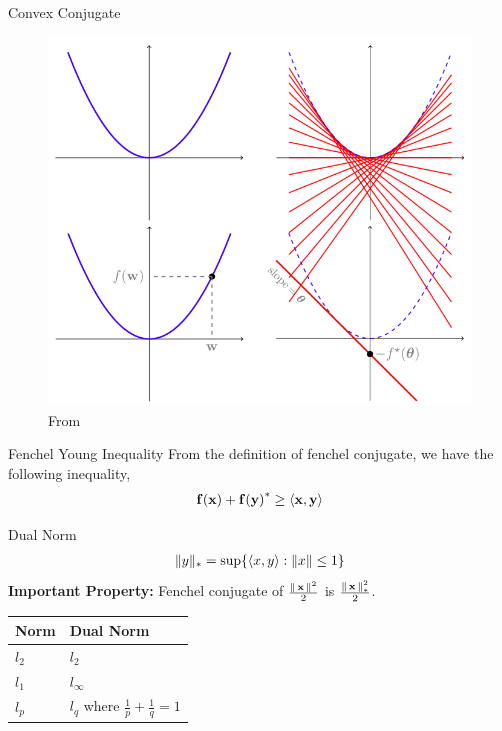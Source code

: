 \begin{frame}{Convex Conjugate}
  \begin{figure}
    \includegraphics[scale=0.27]{images/fenchel.png}
    \caption{From \cite{ShSh2012}}
  \end{figure}
\end{frame}

\begin{frame}{Fenchel Young Inequality}
  From the definition of fenchel conjugate, we have the following inequality,
  \begin{align*}
    \operatorname{\mathbf{f}}(\operatorname{\mathbf{x}}) + {\operatorname{\mathbf{f}}(\operatorname{\mathbf{y}})}^{*} \ge \langle {\operatorname{\mathbf{x}}} , {\operatorname{\mathbf{y}}} \rangle
  \end{align*}
\end{frame}

\begin{frame}{Dual Norm}
  \begin{align*}
    \|y\|_{*} = \sup\{\langle {x} , {y} \rangle : \|x\| \le 1\}
  \end{align*}
      {\bf Important Property:} Fenchel conjugate of $\frac{\|\operatorname{\mathbf{x}}\|^2}{2}$ is $\frac{\|\operatorname{\mathbf{x}}\|_{*}^2}{2}$.
      \begin{center}
        \begin{tabular}{ll}
          Norm & Dual Norm\\
          \hline
          $l_2$ & $l_2$\\
          $l_1$ & $l_{\infty}$\\
          $l_p$ & $l_q$ where $\frac{1}{p}+\frac{1}{q}=1$\\
        \end{tabular}
      \end{center}
\end{frame}

